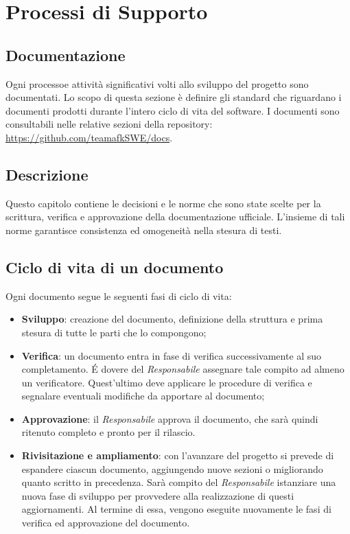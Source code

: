\section{Processi di Supporto}
\subsection{Documentazione}
Ogni processo\glo e attività significativi volti allo sviluppo del progetto sono documentati. Lo scopo di questa sezione è definire gli standard che riguardano i documenti prodotti durante l'intero ciclo di vita del software. I documenti sono consultabili nelle relative sezioni della repository\glo: \url{https://github.com/teamafkSWE/docs}. 		

\subsection{Descrizione}
Questo capitolo contiene le decisioni e le norme che sono state scelte per la scrittura, verifica e approvazione della documentazione ufficiale. L'insieme di tali norme garantisce consistenza ed omogeneità nella stesura di testi.

\subsection{Ciclo di vita di un documento}
Ogni documento segue le seguenti fasi di ciclo di vita:
\begin{itemize}
\item \textbf{Sviluppo}: creazione del documento, definizione della struttura e prima stesura di tutte le parti che lo compongono;
\item \textbf{Verifica}: un documento entra in fase di verifica successivamente al suo completamento. \'E dovere del \textit{Responsabile} assegnare tale compito ad almeno un verificatore. Quest'ultimo deve applicare le procedure di verifica e segnalare eventuali modifiche da apportare al documento;
\item \textbf{Approvazione}: il \textit{Responsabile} approva il documento, che sarà quindi ritenuto completo e pronto per il rilascio.
\item \textbf{Rivisitazione e ampliamento}: con l'avanzare del progetto si prevede di espandere ciascun documento, aggiungendo nuove sezioni o migliorando quanto scritto in precedenza. Sarà compito del \textit{Responsabile} istanziare una nuova fase di sviluppo per provvedere alla realizzazione di questi aggiornamenti. Al termine di essa, vengono eseguite nuovamente le fasi di verifica ed approvazione del documento.
\end{itemize}

